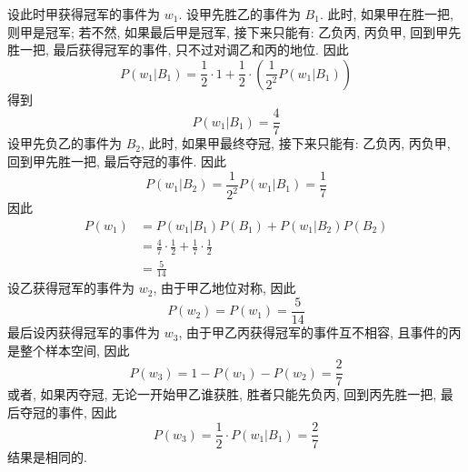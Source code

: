 \documentclass[../main.tex]{subfiles}
\begin{document}
\begin{solution}
   
   设此时甲获得冠军的事件为 \(  w_1  \). 设甲先胜乙的事件为 \(  B_1  \). 此时, 如果甲在胜一把, 则甲是冠军; 若不然, 如果最后甲是冠军, 接下来只能有: 乙负丙, 丙负甲, 回到甲先胜一把, 最后获得冠军的事件, 只不过对调乙和丙的地位. 因此 \[
   P\left( w_1|B_1 \right)= \frac{1 }{2 }\cdot 1+ \frac{1 }{2 }\cdot \left(  \frac{1 }{2^{2} }P\left( w_1|B_1 \right)   \right)    
   \] 得到 \[
P\left( w_1|B_1 \right)= \frac{4 }{7 }  
   \]设甲先负乙的事件为 \(  B_2  \), 此时, 如果甲最终夺冠, 接下来只能有: 乙负丙, 丙负甲,  回到甲先胜一把, 最后夺冠的事件. 因此 \[
   P\left( w_1|B_2 \right)= \frac{1 }{2^{2} }  P\left( w_1|B_1 \right)= \frac{1 }{7 }  
   \]因此 \[
   \begin{aligned}
   P\left( w_1 \right)&= P\left( w_1|B_1 \right)  P\left( B_1 \right)+ P\left( w_1|B_2 \right)P\left( B_2 \right)\\ 
    &= \frac{4 }{7 }\cdot \frac{1 }{2 }+ \frac{1 }{7 }\cdot \frac{1 }{2 }\\ 
     &=     \frac{5 }{14 }  
   \end{aligned}   
   \]设乙获得冠军的事件为 \(  w_2  \), 由于甲乙地位对称, 因此 \[
   P\left( w_2 \right)= P\left( w_1 \right)= \frac{5 }{14 }   
   \]最后设丙获得冠军的事件为 \(  w_3  \),  由于甲乙丙获得冠军的事件互不相容, 且事件的丙是整个样本空间, 因此 \[
   P\left( w_3 \right)= 1-P\left( w_1 \right)-P\left( w_2 \right)= \frac{2 }{7 }    
   \]或者, 如果丙夺冠, 无论一开始甲乙谁获胜, 胜者只能先负丙, 回到丙先胜一把, 最后夺冠的事件, 因此 \[
   P\left( w_3 \right)= \frac{1 }{2 }\cdot P\left( w_1|B_1 \right)= \frac{2 }{7 }    
   \]结果是相同的.
\end{solution}
\end{document}
